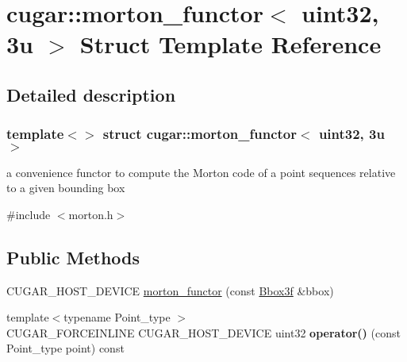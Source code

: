 \hypertarget{structcugar_1_1morton__functor_3_01uint32_00_013u_01_4}{}\section{cugar\+:\+:morton\+\_\+functor$<$ uint32, 3u $>$ Struct Template Reference}
\label{structcugar_1_1morton__functor_3_01uint32_00_013u_01_4}


\subsection{Detailed description}
\subsubsection*{template$<$$>$\newline
struct cugar\+::morton\+\_\+functor$<$ uint32, 3u $>$}

a convenience functor to compute the Morton code of a point sequences relative to a given bounding box 

{\ttfamily \#include $<$morton.\+h$>$}

\subsection*{Public Methods}
\begin{DoxyCompactItemize}
\item 
C\+U\+G\+A\+R\+\_\+\+H\+O\+S\+T\+\_\+\+D\+E\+V\+I\+CE \hyperlink{structcugar_1_1morton__functor_3_01uint32_00_013u_01_4_a6bca6785e96ad7ee48e551cebcbaa48a}{morton\+\_\+functor} (const \hyperlink{structcugar_1_1_bbox}{Bbox3f} \&bbox)
\item 
\mbox{\label{structcugar_1_1morton__functor_3_01uint32_00_013u_01_4_a1d009ac5ef26058e56913165837787e3}} 
{\footnotesize template$<$typename Point\+\_\+type $>$ }\\C\+U\+G\+A\+R\+\_\+\+F\+O\+R\+C\+E\+I\+N\+L\+I\+NE C\+U\+G\+A\+R\+\_\+\+H\+O\+S\+T\+\_\+\+D\+E\+V\+I\+CE uint32 {\bfseries operator()} (const Point\+\_\+type point) const
\end{DoxyCompactItemize}

